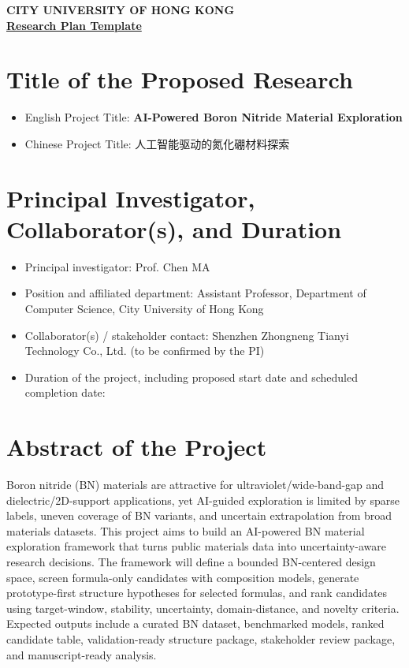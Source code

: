\documentclass[10pt,a4paper]{article}
\newcommand{\blank}[1][7em]{\colorbox{yellow!35}{\rule{0pt}{1.05em}\hspace{#1}}}
\begin{document}
\vspace*{-34pt}
\begin{center}
    \textbf{CITY UNIVERSITY OF HONG KONG}\\
    \vspace{6pt}
    \underline{\textbf{Research Plan Template}}
\end{center}

\section{Title of the Proposed Research}
\begin{itemize}[leftmargin=15pt]
    \item English Project Title: \textbf{AI-Powered Boron Nitride Material Exploration}
    \item Chinese Project Title: 人工智能驱动的氮化硼材料探索
\end{itemize}

\section{Principal Investigator, Collaborator(s), and Duration}
\begin{itemize}[leftmargin=15pt]
    \item Principal investigator: Prof. Chen MA
    \item Position and affiliated department: Assistant Professor, Department of Computer Science, City University of Hong Kong
    \item Collaborator(s) / stakeholder contact: Shenzhen Zhongneng Tianyi Technology Co., Ltd. (to be confirmed by the PI)
    \item Duration of the project, including proposed start date and scheduled completion date:\\[-1pt]\blank[18em]
\end{itemize}

\section{Abstract of the Project}
Boron nitride (BN) materials are attractive for ultraviolet/wide-band-gap and dielectric/2D-support applications, yet AI-guided exploration is limited by sparse labels, uneven coverage of BN variants, and uncertain extrapolation from broad materials datasets. This project aims to build an AI-powered BN material exploration framework that turns public materials data into uncertainty-aware research decisions. The framework will define a bounded BN-centered design space, screen formula-only candidates with composition models, generate prototype-first structure hypotheses for selected formulas, and rank candidates using target-window, stability, uncertainty, domain-distance, and novelty criteria. Expected outputs include a curated BN dataset, benchmarked models, ranked candidate table, validation-ready structure package, stakeholder review package, and manuscript-ready analysis.
\end{document}
